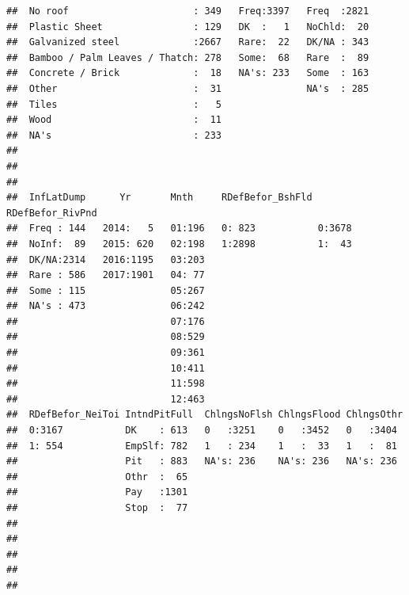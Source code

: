 \documentclass[11pt,]{article}
\begin{document}
\begin{verbatim}
##  No roof                      : 349   Freq:3397   Freq  :2821  
##  Plastic Sheet                : 129   DK  :   1   NoChld:  20  
##  Galvanized steel             :2667   Rare:  22   DK/NA : 343  
##  Bamboo / Palm Leaves / Thatch: 278   Some:  68   Rare  :  89  
##  Concrete / Brick             :  18   NA's: 233   Some  : 163  
##  Other                        :  31               NA's  : 285  
##  Tiles                        :   5                            
##  Wood                         :  11                            
##  NA's                         : 233                            
##                                                                
##                                                                
##                                                                
##  InfLatDump      Yr       Mnth     RDefBefor_BshFld RDefBefor_RivPnd
##  Freq : 144   2014:   5   01:196   0: 823           0:3678          
##  NoInf:  89   2015: 620   02:198   1:2898           1:  43          
##  DK/NA:2314   2016:1195   03:203                                    
##  Rare : 586   2017:1901   04: 77                                    
##  Some : 115               05:267                                    
##  NA's : 473               06:242                                    
##                           07:176                                    
##                           08:529                                    
##                           09:361                                    
##                           10:411                                    
##                           11:598                                    
##                           12:463                                    
##  RDefBefor_NeiToi IntndPitFull  ChlngsNoFlsh ChlngsFlood ChlngsOthr 
##  0:3167           DK    : 613   0   :3251    0   :3452   0   :3404  
##  1: 554           EmpSlf: 782   1   : 234    1   :  33   1   :  81  
##                   Pit   : 883   NA's: 236    NA's: 236   NA's: 236  
##                   Othr  :  65                                       
##                   Pay   :1301                                       
##                   Stop  :  77                                       
##                                                                     
##                                                                     
##                                                                     
##                                                                     
##                                                                     

\end{verbatim}
\end{document}
